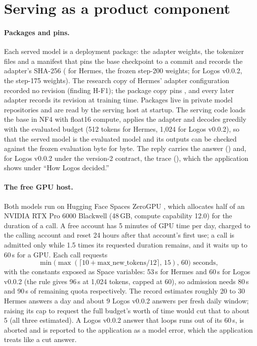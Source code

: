 \section{Serving as a product component}\label{sec:serving}

\paragraph{Packages and pins.}
Each served model is a deployment package: the adapter weights, the tokenizer files and a manifest that pins the base checkpoint to a commit and records the adapter's SHA-256 ( for Hermes, the frozen step-200 weights;  for Logos v0.0.2, the step-175 weights). The research copy of Hermes' adapter configuration recorded no revision (finding H-F1); the package copy pins , and every later adapter records its revision at training time. Packages live in private model repositories and are read by the serving host at startup. The serving code loads the base in NF4 with float16 compute, applies the adapter and decodes greedily with the evaluated budget (512 tokens for Hermes, 1,024 for Logos v0.0.2), so that the served model is the evaluated model and its outputs can be checked against the frozen evaluation byte for byte. The reply carries the answer () and, for Logos v0.0.2 under the version-2 contract, the trace (), which the \kleos{} application shows under ``How Logos decided.''

\paragraph{The free GPU host.}
Both models run on Hugging Face Spaces ZeroGPU \citep{huggingface2026zerogpu}, which allocates half of an NVIDIA RTX Pro 6000 Blackwell (48\,GB, compute capability 12.0) for the duration of a call. A free account has 5 minutes of GPU time per day, charged to the calling account and reset 24 hours after that account's first use; a call is admitted only while 1.5 times its requested duration remains, and it waits up to 60\,s for a GPU. Each call requests
\begin{equation}
\min\bigl(\max(\lceil 10 + \text{max\_new\_tokens} / 12 \rceil,\, 15),\, 60\bigr) \text{ seconds},
\end{equation}
with the constants exposed as Space variables: 53\,s for Hermes and 60\,s for Logos v0.0.2 (the rule gives 96\,s at 1,024 tokens, capped at 60), so admission needs 80\,s and 90\,s of remaining quota respectively. The record estimates roughly 20 to 30 Hermes answers a day and about 9 Logos v0.0.2 answers per fresh daily window; raising its cap to request the full budget's worth of time would cut that to about 5 (all three estimated). A Logos v0.0.2 answer that loops runs out of its 60\,s, is aborted and is reported to the application as a model error, which the application treats like a cut answer.

